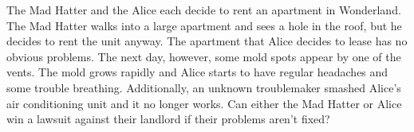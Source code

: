 \item The Mad Hatter and the Alice each decide to rent an apartment in
Wonderland.  The Mad Hatter walks into a large apartment and sees a hole in the
roof, but he decides to rent the unit anyway.  The apartment that Alice decides
to lease has no obvious problems.  The next day, however, some mold spots
appear by one of the vents.  The mold grows rapidly and Alice starts to have
regular headaches and some trouble breathing.  Additionally, an unknown
troublemaker smashed Alice's air conditioning unit and it no longer works.  Can
either the Mad Hatter or Alice win a lawsuit against their landlord if their
problems aren't fixed?  

